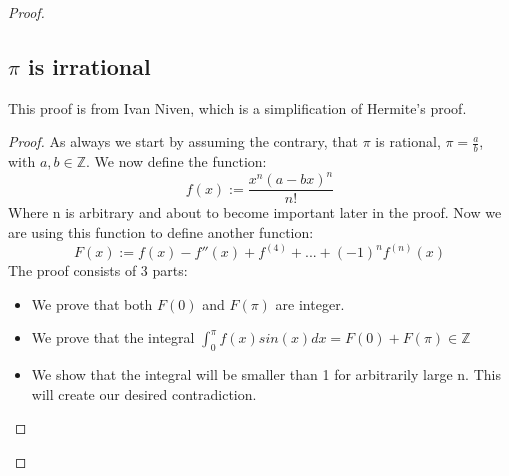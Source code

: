 \documentclass{article}
\theoremstyle{definition}
\begin{document}
\begin{proof}
\subsection{$\pi $ is irrational}
This proof is from Ivan Niven, which is a simplification of Hermite's proof. 
\begin{proof}
    As always we start by assuming the contrary, that $\pi$ is rational, $\pi = \frac{a}{b}$, with $a,b\in \mathbb{Z}$. We now define the function:
    \begin{equation}
    \label{f(x)}
    f(x) := \frac{x^n(a-bx)^n}{n!}
    \end{equation}
    Where n is arbitrary and about to become important later in the proof. Now we are using this function to define another function:
    \begin{equation}
        F(x) := f(x) - f''(x) + f^{(4)} +...+(-1)^nf^{(n)}(x) 
    \end{equation}
    The proof consists of 3 parts:
    \begin{itemize}
        \item We prove that both $F(0)$ and $F(\pi)$ are integer.
        \item We prove that the integral $\int_0^{\pi}f(x)sin(x)dx=F(0)+F(\pi)\in \mathbb{Z}$
        \item We show that the integral will be smaller than 1 for arbitrarily large n. This will create our desired contradiction.
    \end{itemize}


\end{proof}
\end{proof}
\end{document}
